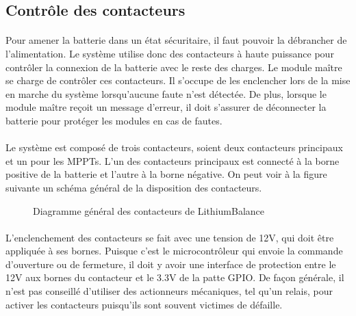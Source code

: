 
\subsection{Contrôle des contacteurs}

	\paragraph*{}
	Pour amener la batterie dans un état sécuritaire, il faut pouvoir la débrancher de l'alimentation. Le système utilise donc des contacteurs à haute puissance pour contrôler la connexion de la batterie avec le reste des charges. Le module maître se charge de contrôler ces contacteurs. Il s'occupe de les enclencher lors de la mise en marche du système lorsqu'aucune faute n'est détectée. De plus, lorsque le module maître reçoit un message d'erreur, il doit s'assurer de déconnecter la batterie pour protéger les modules en cas de fautes.

	\paragraph*{}
	Le système est composé de trois contacteurs, soient deux contacteurs principaux et un pour les MPPTs. L'un des contacteurs principaux est connecté à la borne positive de la batterie et l'autre à la borne négative. On peut voir à la figure suivante un schéma général de la disposition des contacteurs. 
	
	\begin{figure}[H]
		\centering
		\caption{Diagramme général des contacteurs de LithiumBalance \cite{Lithium_Balance}}
		\label{fig:lithiumbalancecontactordiagram}
	\end{figure}

	\paragraph*{}
	L'enclenchement des contacteurs se fait avec une tension de 12V, qui doit être appliquée à ses bornes. Puisque c'est le microcontrôleur qui envoie la commande d'ouverture ou de fermeture, il doit y avoir une interface de protection entre le 12V aux bornes du contacteur et le 3.3V de la patte GPIO. De façon générale, il n'est pas conseillé d'utiliser des actionneurs mécaniques, tel qu'un relais, pour activer les contacteurs puisqu'ils sont souvent victimes de défaille. 	 


